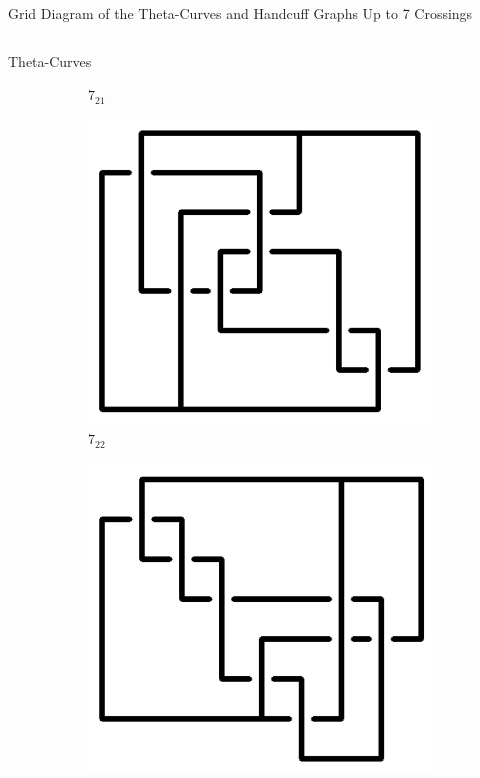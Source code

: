 \documentclass[final]{beamer}
\begin{document}
\begin{frame}[t]
\begin{alertblock}{Grid Diagram of the Theta-Curves and Handcuff Graphs Up to 7 Crossings}
\begin{columns}[t]
\begin{column}{0.5\textwidth}
\begin{alertblock}{Theta-Curves}
\begin{figure}
\begin{subfigure}{0.075\textwidth}
    \caption{$7_{21}$} 
    \end{subfigure}
    \begin{subfigure}{0.075\textwidth}
    \includegraphics[width=\columnwidth]{../Midterm_Poster/grid_diagram/theta_7_22.png}
    \caption{$7_{22}$} 
    \end{subfigure}
    \begin{subfigure}{0.075\textwidth}
    \includegraphics[width=\columnwidth]{../Midterm_Poster/grid_diagram/theta_7_23.png}

\end{subfigure}
\end{figure}
\end{alertblock}
\end{column}
\end{columns}
\end{alertblock}
\end{frame}
\end{document}
